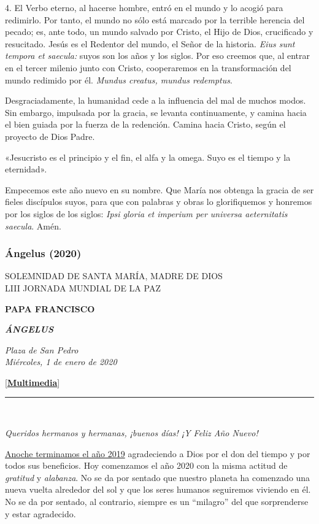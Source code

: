 4. El Verbo eterno, al hacerse hombre, entró en el mundo y lo acogió
para redimirlo. Por tanto, el mundo no sólo está marcado por la terrible
herencia del pecado; es, ante todo, un mundo salvado por Cristo, el Hijo
de Dios, crucificado y resucitado. Jesús es el Redentor del mundo, el
Señor de la historia. \emph{Eius sunt tempora et saecula:} suyos son los
años y los siglos. Por eso creemos que, al entrar en el tercer milenio
junto con Cristo, cooperaremos en la transformación del mundo redimido
por él. \emph{Mundus creatus, mundus redemptus}.

Desgraciadamente, la humanidad cede a la influencia del mal de muchos
modos. Sin embargo, impulsada por la gracia, se levanta continuamente, y
camina hacia el bien guiada por la fuerza de la redención. Camina hacia
Cristo, según el proyecto de Dios Padre.

«Jesucristo es el principio y el fin, el alfa y la omega. Suyo es el
tiempo y la eternidad».

Empecemos este año nuevo en su nombre. Que María nos obtenga la gracia
de ser fieles discípulos suyos, para que con palabras y obras lo
glorifiquemos y honremos por los siglos de los siglos: \emph{Ipsi gloria
	et imperium per universa aeternitatis saecula}. Amén.

\subsubsection{Ángelus (2020)}
SOLEMNIDAD DE SANTA MARÍA, MADRE DE DIOS\\
LIII JORNADA MUNDIAL DE LA PAZ

\textbf{PAPA FRANCISCO}

\textbf{\emph{ÁNGELUS}}

\emph{Plaza de San Pedro\\
	Miércoles, 1 de enero de 2020}

{[}\textbf{\href{http://w2.vatican.va/content/francesco/es/events/event.dir.html/content/vaticanevents/es/2020/1/1/angelus.html}{Multimedia}}{]}

\begin{center}\rule{0.5\linewidth}{\linethickness}\end{center}

~

\emph{Queridos hermanos y hermanas, ¡buenos días! ¡Y Feliz Año Nuevo!}

\href{http://w2.vatican.va/content/francesco/es/events/event.dir.html/content/vaticanevents/es/2019/12/31/te-deum.html}{Anoche
	terminamos el año 2019} agradeciendo a Dios por el don del tiempo y por
todos sus beneficios. Hoy comenzamos el año 2020 con la misma actitud de
\emph{gratitud} y \emph{alabanza}. No se da por sentado que nuestro
planeta ha comenzado una nueva vuelta alrededor del sol y que los seres
humanos seguiremos viviendo en él. No se da por sentado, al contrario,
siempre es un ``milagro'' del que sorprenderse y estar agradecido.

